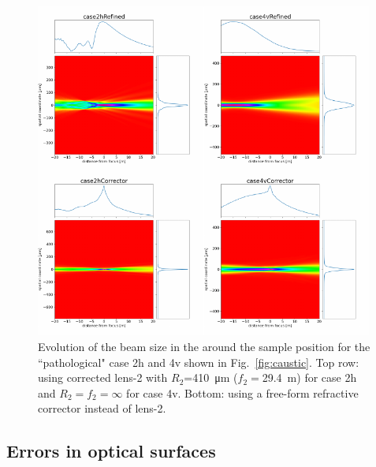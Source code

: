 \documentclass{iucr}              %
\begin{document}


\begin{figure}\label{fig:causticcorrection}
\centering

\includegraphics[width=0.99\textwidth]{figures/fig_caustic_correction.pdf}

\caption{Evolution of the beam size in the around the sample position for the ``pathological" case 2h and 4v shown in Fig.~\ref{fig:caustic}. Top row: using corrected lens-2 with $R_2$=\SI{410}{\micro\meter} ($f_2=$\SI{29.4}{\meter}) for case 2h and $R_2=f_2=\infty$ for case 4v. Bottom: using a free-form refractive corrector instead of lens-2.
}
\end{figure}


\subsection{Errors in optical surfaces}
\end{document}
